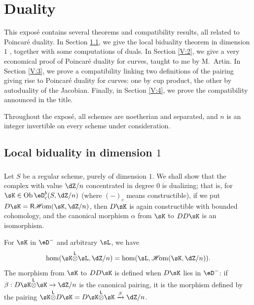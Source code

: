 
\chapter{Duality}\label{V}

This exposé contains several theorems and compatibility results, all related
to Poincaré duality. In Section \ref{V:1}, we give the local biduality theorem
in dimension $1$ \cite[I.5.1]{sga5}, together with some computations of
duals. In Section \ref{V:2}, we give a very economical proof of Poincaré
duality for curves, taught to me by M.\ Artin. In Section \ref{V:3}, we prove
a compatibility linking two definitions of the pairing giving rise to
Poincaré duality for curves: one by cup product, the other by autoduality of
the Jacobian. Finally, in Section \ref{V:4}, we prove the compatibility
announced in the title.

Throughout the exposé, all schemes are noetherian and separated, and $n$ is
an integer invertible on every scheme under consideration.


\section{Local biduality in dimension \texorpdfstring{$1$}{1}}\label{V:1}


\subsection{}\label{V:1-1}

Let $S$ be a regular scheme, purely of dimension $1$. We shall show that the
complex with value $\dZ/n$ concentrated in degree $0$ is dualizing; that is,
for $\sK\in \ob\eD_c^b(S,\dZ/n)$ (where $(-)_c$ means constructible), if we
put $D\sK=\rHom(\sK,\dZ/n)$, then $D\sK$ is again
constructible with bounded cohomology, and the canonical morphism $\alpha$
from $\sK$ to $D D\sK$ is an isomorphism.

For $\sK$ in $\eD^-$ and arbitrary $\sL$, we have
\[
  \hom(\sK\lotimes \sL,\dZ/n) = \hom(\sL,\Hom(\sK,\dZ/n)) \text{.}
\]
The morphism from $\sK$ to $DD\sK$ is defined when $D\sK$ lies in $\eD^-$:
if $\beta:D\sK\lotimes\sK\to \dZ/n$ is the canonical pairing, it is the
morphism defined by the pairing
$\sK\lotimes D\sK=D\sK\lotimes \sK \xrightarrow\beta \dZ/n$.


\subsection{}\label{V:1-2}

